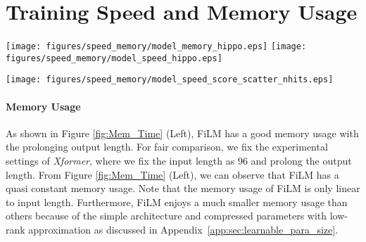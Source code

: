 \documentclass{article}
\begin{document}
 \section{Training Speed and Memory Usage}
\label{app:time}

\begin{figure*}[h]
    \centering
\texttt{[image: figures/speed\_memory/model\_memory\_hippo.eps]}
    \texttt{[image: figures/speed\_memory/model\_speed\_hippo.eps]}
\caption{(Left) the memory usage of FiLM and baseline models. (Right) training speed of FiLM and baseline models. The input length is fixed to 96 and the output length is 768, 1536, 3072, 4608, and 7680.}
    \label{fig:Mem_Time}
\end{figure*}

\begin{figure*}[h]
    \centering
\texttt{[image: figures/speed\_memory/model\_speed\_score\_scatter\_nhits.eps]}
\caption{Comparison of training speed and performance of benchmarks. The experiment is performed on ETTm2 with output length = 96, 192, 336, and 720. The performance of the models is measured with \textit{Score}, where . The radius of the circle measured the STD of the performance. A higher \textit{Score} indicates better performance, same for \textit{Speed}. A smaller circle indicates better robustness. The \textit{Speed} and \textit{Score} are presented on relative value.}
    \label{fig:Time_score_scatter}
\end{figure*}


\paragraph{Memory Usage}
As shown in Figure \ref{fig:Mem_Time} (Left), FiLM has a good memory usage with the prolonging output length. For fair comparison, we fix the experimental settings of \textit{Xformer}, where we fix the input length as 96 and prolong the output length. From Figure \ref{fig:Mem_Time} (Left), we can observe that FiLM has a quasi constant memory usage. Note that the memory usage of FiLM is only linear to input length. Furthermore, FiLM enjoys a much smaller memory usage than others because of the simple architecture and compressed parameters with low-rank approximation as discussed in Appendix~\ref{app:sec:learnable_para_size}.
\end{document}
